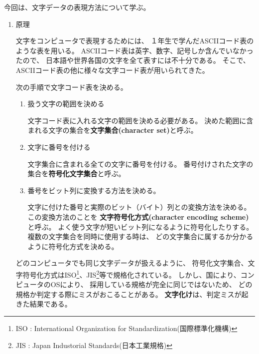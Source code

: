 \documentclass[uplatex]{jsarticle}
\begin{document}
\def\lstlistingname{リスト}


今回は、文字データの表現方法について学ぶ。

\begin{enumerate}

\item 原理

文字をコンピュータで表現するためには、
１年生で学んだASCIIコード表のような表を用いる。
ASCIIコード表は英字、数字、記号しか含んでいなかったので、
日本語や世界各国の文字を全て表すには不十分である。
そこで、ASCIIコード表の他に様々な文字コード表が用いられてきた。

次の手順で文字コード表を決める。

\begin{enumerate}
\item 扱う文字の範囲を決める

文字コード表に入れる文字の範囲を決める必要がある。
決めた範囲に含まれる文字の集合を{\bf 文字集合(character set)}と呼ぶ。

\item 文字に番号を付ける

文字集合に含まれる全ての文字に番号を付ける。
番号付けされた文字の集合を{\bf 符号化文字集合}と呼ぶ。

\item 番号をビット列に変換する方法を決める。

文字に付けた番号と実際のビット（バイト）列との変換方法を決める。
この変換方法のことを
{\bf 文字符号化方式(character encoding scheme)}と呼ぶ。
よく使う文字が短いビット列になるように符号化したりする。
複数の文字集合を同時に使用する時は、
どの文字集合に属するか分かるように符号化方式を決める。
\end{enumerate}

どのコンピュータでも同じ文字データが扱えるように、
符号化文字集合、文字符号化方式はISO\footnote{
ISO : International Organization for Standardization(国際標準化機構)
}、JIS\footnote{
JIS : Japan Industorial Standards(日本工業規格)
}等で規格化されている。
しかし、国により、コンピュータのOSにより、
採用している規格が完全に同じではないため、
どの規格か判定する際にミスがおこることがある。
{\bf 文字化け}は、判定ミスが起きた結果である。


\end{enumerate}
\end{document}

